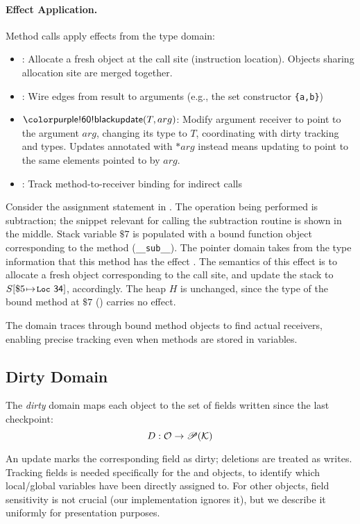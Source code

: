 \paragraph{Effect Application.}
Method calls apply effects from the type domain:
\begin{itemize}
\item \tnew: Allocate a fresh object at the call site (instruction location). Objects sharing allocation site are merged together.
\item \tptstoargs: Wire edges from result to arguments (e.g., the set constructor \texttt{\{a,b\}})
\item $\tupdate(T, arg)$: Modify argument receiver to point to the argument $arg$, changing its type to $T$, coordinating with dirty tracking and types. Updates annotated with $*arg$ instead means updating to point to the same elements pointed to by $arg$. 
\item \tboundmeth: Track method-to-receiver binding for indirect calls
\end{itemize}

\begin{example}
%
Consider the assignment statement in .
The operation being performed is subtraction;
the \spytecode snippet relevant for calling the
subtraction routine is shown in the middle.
Stack variable $\$7$ is populated with a bound 
function object corresponding to the method (\lstinline|__sub__|).
The pointer domain takes from the type information that this method has the effect \tnew.
The semantics of this effect is to allocate a fresh object  corresponding to the call site, and update the stack to $S[\$5{\hspace{1pt}\mapsto\hspace{1pt}}\textsf{\texttt{\small Loc}~{34}}]$, accordingly.
The heap $H$ is unchanged, since the type of the bound method at $\$7$ () carries no \tupdate effect.
\end{example}


The domain traces through bound method objects to find actual receivers, enabling precise tracking even when methods are stored in variables.

\subsection{Dirty Domain}
The \emph{dirty} domain maps each object to the set of fields written since the last checkpoint:
\[D : \mathcal{O} \to \mathscr{P}(\mathcal{K})\]

An update marks the corresponding field as dirty; deletions are treated as writes. 
Tracking fields is needed specifically for the \tLOCALS and \tGLOBALS objects, to identify which local/global variables have been directly assigned to.
For other objects, field sensitivity is not crucial (our implementation ignores it),
but we describe it uniformly for presentation purposes.

